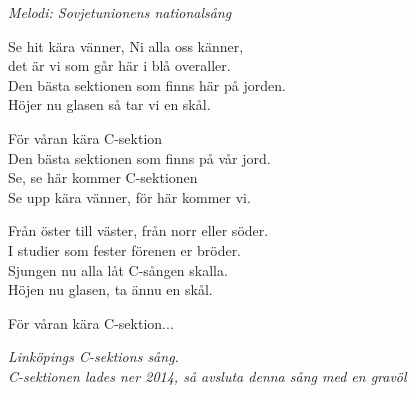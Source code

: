 {\footnotesize\textit{Melodi: Sovjetunionens nationalsång}}\par
\vspace{10pt}
Se hit kära vänner, Ni alla oss känner,\\
det är vi som går här i blå overaller.\\
Den bästa sektionen som finns här på jorden.\\
Höjer nu glasen så tar vi en skål.\par
\vspace{10pt}
\revrpt För våran kära C-sektion \rpt\\
Den bästa sektionen som finns på vår jord.\\
\revrpt Se, se här kommer C-sektionen \rpt\\
Se upp kära vänner, för här kommer vi.\par
\vspace{10pt}
Från öster till väster, från norr eller söder.\\
I studier som fester förenen er bröder.\\
Sjungen nu alla låt C-sången skalla.\\
Höjen nu glasen, ta ännu en skål.\par
\vspace{10pt}
För våran kära C-sektion...
\par
\vspace{10pt}
{\footnotesize\textit{Linköpings C-sektions sång. \\
					 C-sektionen lades ner 2014, så avsluta denna sång med en gravöl}}

